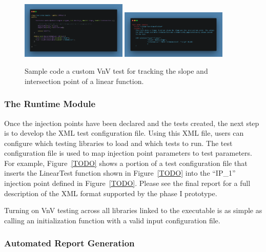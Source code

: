 \begin{figure}
 \centering
 \includegraphics[width=0.45\textwidth]{./narrative/figures/testcode-example.png}
 \includegraphics[width=0.45\textwidth]{./narrative/figures/test-example.png} 
 \caption{Sample code a custom VnV test for tracking the slope and intersection point of a linear function. \label{fig:test-example}}
\end{figure}

\subsubsection{The Runtime Module}

Once the injection points have been declared and the tests created, the next step is to develop the XML test configuration file. Using this XML file, users can configure which testing libraries to load and which tests to run. The test configuration file is used to map injection point parameters to test parameters. For example, Figure~\ref{TODO} shows a portion of a test configuration file that inserts the LinearTest function shown in Figure~\ref{TODO} into the ``IP\_1'' injection point defined in Figure~\ref{TODO}. Please see the final report for a full description of the XML format supported by the phase I prototype.

Turning on VnV testing across all libraries linked to the executable is as simple as calling an initialization function with a valid input configuration file.

\subsubsection{Automated Report Generation}

